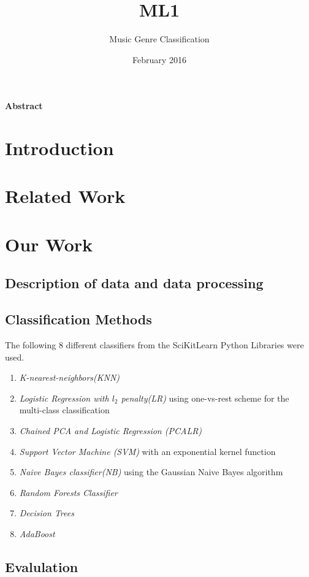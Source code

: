\documentclass{article}
\title{ML1}
\author{Music Genre Classification}
\date{February 2016}
\begin{document}
\maketitle

\textbf{Abstract}

\section{Introduction}

\section{Related Work}

\section{Our Work}
\subsection{Description of data and data processing}

\subsection{Classification Methods}

The following 8 different classifiers from the SciKitLearn Python Libraries were used. 
\begin{enumerate}
    \item \textit{K-nearest-neighbors(KNN)} 
    \item \textit{Logistic Regression with $l_2$ penalty(LR)} using one-vs-rest scheme for the multi-class classification
    \item \textit{Chained PCA and Logistic Regression (PCALR)}
    \item \textit{Support Vector Machine (SVM)} with an exponential kernel function
    \item \textit{Naive Bayes classifier(NB)} using the Gaussian Naive Bayes algorithm
    \item \textit{Random Forests Classifier}
    \item \textit{Decision Trees} 
    \item \textit{AdaBoost}
\end{enumerate}

\subsection{Evalulation}
\end{document}
